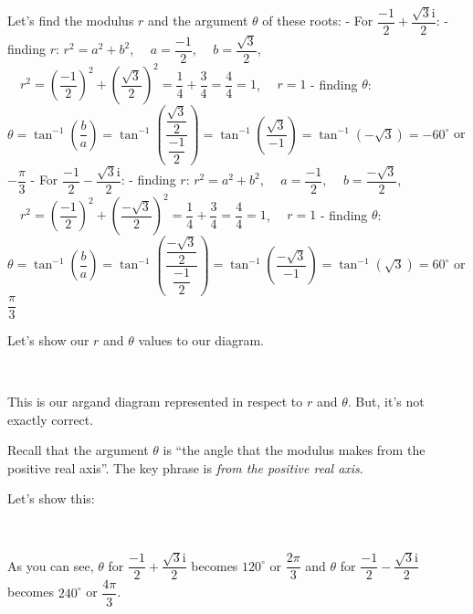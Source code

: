 \documentclass[11pt]{article}
\begin{document}
    Let's find the modulus \(r\) and the argument \(\theta\) of these roots:
- For \(\dfrac{-1}{2} + \dfrac{\sqrt{3}\mathrm{i}}{2}\): - finding
\(r\): \(r^2 = a^2 + b^2\), \(\quad a = \dfrac{-1}{2}\),
\(\quad b =  \dfrac{\sqrt{3}}{2}\),
\(\quad r^2 = (\dfrac{-1}{2})^2 + (\dfrac{\sqrt{3}}{2})^2 = \dfrac{1}{4} + \dfrac{3}{4} = \dfrac{4}{4} = 1\),
\(\quad r = 1\) - finding \(\theta\):
\(\theta = \tan^{-1}(\dfrac{b}{a}) = \tan^{-1}(\dfrac{\dfrac{\sqrt{3}}{2}}{\dfrac{-1}{2}}) = \tan^{-1}(\dfrac{\sqrt{3}}{-1}) = \tan^{-1}(-\sqrt{3}) = -60^\circ\)
or \(-\dfrac{\pi}{3}\) - For
\(\dfrac{-1}{2} - \dfrac{\sqrt{3}\mathrm{i}}{2}\): - finding \(r\):
\(r^2 = a^2 + b^2\), \(\quad a = \dfrac{-1}{2}\),
\(\quad b =  \dfrac{-\sqrt{3}}{2}\),
\(\quad r^2 = (\dfrac{-1}{2})^2 + (\dfrac{-\sqrt{3}}{2})^2 = \dfrac{1}{4} + \dfrac{3}{4} = \dfrac{4}{4} = 1\),
\(\quad r = 1\) - finding \(\theta\):
\(\theta = \tan^{-1}(\dfrac{b}{a}) = \tan^{-1}(\dfrac{\dfrac{-\sqrt{3}}{2}}{\dfrac{-1}{2}}) = \tan^{-1}(\dfrac{-\sqrt{3}}{-1}) = \tan^{-1}(\sqrt{3}) = 60^\circ\)
or \(\dfrac{\pi}{3}\)

Let's show our \(r\) and \(\theta\) values to our diagram.

    \begin{center}
    \end{center}
    { \hspace*{\fill} \\}
    
    This is our argand diagram represented in respect to \(r\) and
\(\theta\). But, it's not exactly correct.

Recall that the argument \(\theta\) is ``the angle that the modulus
makes from the positive real axis''. The key phrase is \emph{from the
positive real axis}.

Let's show this:

    \begin{center}
    \end{center}
    { \hspace*{\fill} \\}
    
    As you can see, \(\theta\) for
\(\dfrac{-1}{2} + \dfrac{\sqrt{3}\mathrm{i}}{2}\) becomes \(120^\circ\)
or \(\dfrac{2\pi}{3}\) and \(\theta\) for
\(\dfrac{-1}{2} - \dfrac{\sqrt{3}\mathrm{i}}{2}\) becomes \(240^\circ\)
or \(\dfrac{4\pi}{3}\).
\end{document}
